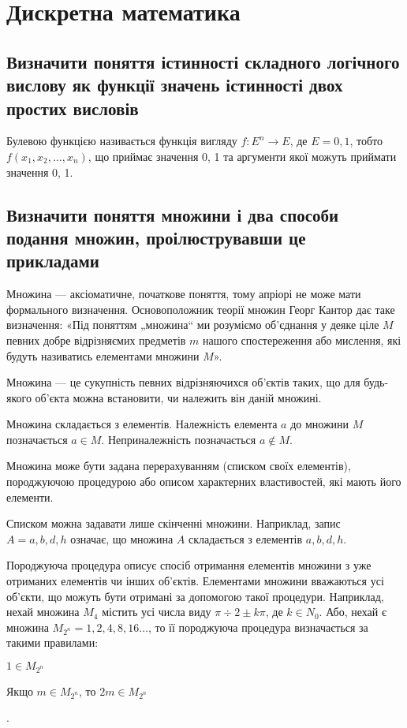 \documentclass[a4paper,oneside,DIV=9,fontsize=12pt]{scrartcl}
\begin{document}
	\section{Дискретна математика}
		\subsection{Визначити поняття істинності складного логічного вислову як функції значень істинності двох простих висловів}
			Булевою функцією називається функція вигляду $f : E^n \rightarrow E$, де $E = {0, 1}$, тобто $f(x_1, x_2, \dots, x_n)$, що приймає значення 0, 1 та аргументи якої можуть приймати значення 0, 1.
		
		\subsection{Визначити поняття множини і два способи подання множин, проілюструвавши це прикладами}
			Множина --- аксіоматичне, початкове поняття, тому апріорі не може мати формального визначення. Основоположник теорії множин Георг Кантор дає таке визначення: «Під поняттям „множина“ ми розуміємо об'єднання у деяке ціле $M$ певних добре відрізняємих предметів $m$ нашого спостереження або мислення, які будуть називатись елементами множини $M$».
		
			Множина --- це сукупність певних відрізняючихся об'єктів таких, що для будь-якого об'єкта можна встановити, чи належить він даній множині.
		
			Множина складається з елементів. Належність елемента $a$ до множини $M$ позначається $a \in M$. Неприналежність позначається $a \notin M$.
		
			Множина може бути задана перерахуванням (списком своїх елементів), породжуючою процедурою або описом характерних властивостей, які мають його елементи.
		
			Списком можна задавати лише скінченні множини. Наприклад, запис $A = {a, b, d, h}$ означає, що множина $A$ складається з елементів $a, b, d, h$.
		
			Породжуюча процедура описує спосіб отримання елементів множини з уже отриманих елементів чи інших об'єктів. Елементами множини вважаються усі об'єкти, що можуть бути отримані за допомогою такої процедури. Наприклад, нехай множина $M_4$ містить усі числа виду $\pi \div 2 \pm k\pi$, де $k \in N_0$. Або, нехай є множина $M_{2^n} = {1, 2, 4, 8, 16 \dots}$, то її породжуюча процедура визначається за такими правилами:
			\begin{enumerate*}
				\item $1 \in M_{2^n}$
				\item Якщо $m \in M_{2^n}$, то $2m \in M_{2^n}$
			\end{enumerate*}.
		
\end{document}
